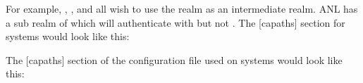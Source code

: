 \documentclass[letterpaper,10pt,english]{sphinxmanual}
\begin{document}
For example, , , and  all wish to
use the  realm as an intermediate realm.  ANL has a sub
realm of  which will authenticate with 
but not .  The {[}capaths{]} section for  systems
would look like this:

%
\begin{sphinxVerbatim}[commandchars=\\\{\}]
\PYG{p}{[}\PYG{p}{]}
      
          
          
          
          
      
          
      
          
      
          
      
          
\end{sphinxVerbatim}

The {[}capaths{]} section of the configuration file used on 
systems would look like this:
\end{document}

